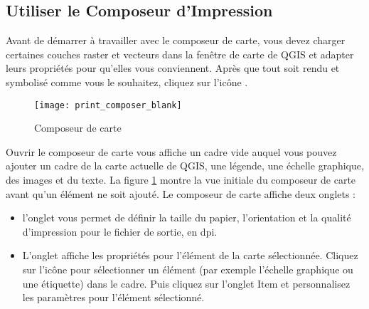 {\subsection{Utiliser le Composeur d'Impression}\label{label_useprintcomposer} 


Avant de démarrer à travailler avec le composeur de carte, vous devez charger
certaines couches raster et vecteurs dans la fenêtre de carte de QGIS et 
adapter leurs propriétés pour qu'elles vous conviennent. Après que tout soit
rendu et symbolisé comme vous le souhaitez, cliquez sur l'icône 
.

\begin{figure}[ht]
   \begin{center}
    \caption{Composeur de carte\nixcaption}
\label{fig:print_composer_blank}\smallskip
   \texttt{[image: print\_composer\_blank]}
\end{center}
\end{figure}

Ouvrir le composeur de carte vous affiche un cadre vide auquel vous pouvez
ajouter un cadre de la carte actuelle de QGIS, une légende, une échelle
graphique, des images et du texte. La figure \ref{fig:print_composer_blank}
montre la vue initiale du composeur de carte avant qu'un élément ne soit
ajouté. Le composeur de carte affiche deux onglets :

\begin{itemize}
\item l'onglet  vous permet de définir la taille du papier,
l'orientation et la qualité d'impression pour le fichier de sortie, en dpi.
\item L'onglet  affiche les propriétés pour l'élément de la carte
sélectionnée. Cliquez sur l'icône
  pour sélectionner
un élément (par exemple l'échelle graphique ou une étiquette) dans le cadre.
Puis cliquez sur l'onglet Item et personnalisez les paramètres pour l'élément
sélectionné.
\end{itemize}

}
